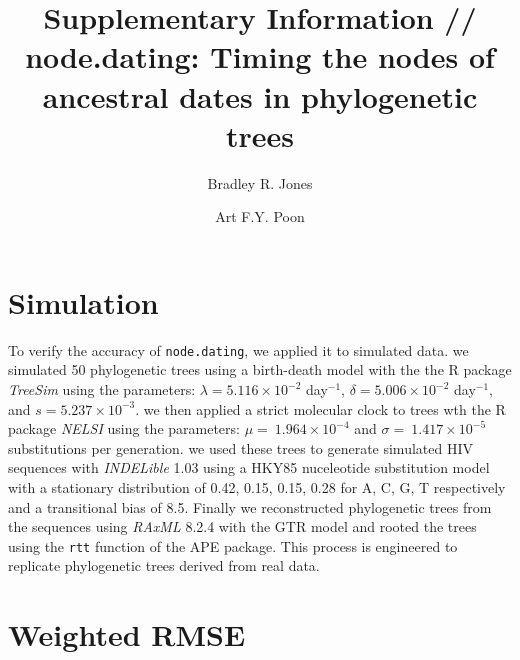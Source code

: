 \documentclass[12pt]{article}
\newcommand{\code}[1]{{\tt #1}}
\begin{document}
\title{Supplementary Information // node.dating: Timing the nodes of ancestral dates in phylogenetic trees}

\author[1,2,*]{Bradley R. Jones}
\author[2,3]{Art F.Y. Poon}

\date{}

\maketitle

\section{Simulation} \label{sec:sim}
To verify the accuracy of \code{node.dating}, we applied it to simulated data.
we simulated 50 phylogenetic trees using a birth-death model with the the R package \emph{TreeSim} \citep{TreeSim} using the parameters: $\lambda = 5.116 \times 10^{-2}$ day$^{-1}$, $\delta = 5.006 \times 10^{-2}$ day$^{-1}$, and $s = 5.237 \times 10^{-3}$.
we then applied a strict molecular clock to trees wth the R package \emph{NELSI} \citep{NELSI} using the parameters: $\mu = \ 1.964\times 10^{-4}$ and $\sigma = \ 1.417\times 10^{-5}$ substitutions per generation.
we used these trees to generate simulated HIV sequences with \emph{INDELible} 1.03 \citep{Indelible09} using a HKY85 nuceleotide substitution model \citep{HKY85} with a stationary distribution of 0.42, 0.15, 0.15, 0.28 for A, C, G, T respectively and a transitional bias of 8.5.
Finally we reconstructed phylogenetic trees from the sequences using \emph{RAxML} 8.2.4 \citep{Raxml14} with the GTR model and rooted the trees using the \code{rtt} function of the APE package.
This process is engineered to replicate phylogenetic trees derived from real data.

\section{Weighted RMSE} \label{sec:rmse}
\end{document}
